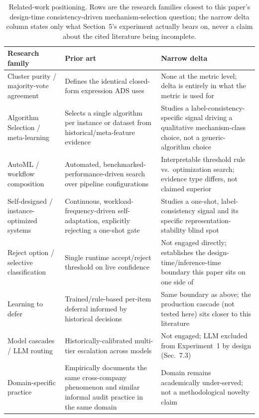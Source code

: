\documentclass[11pt]{article}
\begin{document}
\begin{table}[htbp]
\centering
\caption{Related-work positioning. Rows are the research families closest to
this paper's design-time consistency-driven mechanism-selection question;
the narrow delta column states only what Section~5's experiment actually
bears on, never a claim about the cited literature being incomplete.}
\label{tab:positioning}
\small
\begin{tabular}{p{2.6cm}p{4.1cm}p{4.4cm}}
\toprule
Research family & Prior art & Narrow delta \\
\midrule
Cluster purity / majority-vote agreement & Defines the identical closed-form expression ADS uses & None at the metric level; delta is entirely in what the metric is used for \\
Algorithm Selection / meta-learning & Selects a single algorithm per instance or dataset from historical/meta-feature evidence & Studies a label-consistency-specific signal driving a qualitative mechanism-class choice, not a generic-algorithm choice \\
AutoML / workflow composition & Automated, benchmarked-performance-driven search over pipeline configurations & Interpretable threshold rule vs.\ optimization search; evidence type differs, not claimed superior \\
Self-designed / instance-optimized systems & Continuous, workload-frequency-driven self-adaptation, explicitly rejecting a one-shot gate & Studies a one-shot, label-consistency signal and its specific representation-stability blind spot \\
Reject option / selective classification & Single runtime accept/reject threshold on live confidence & Not engaged directly; establishes the design-time/inference-time boundary this paper sits on one side of \\
Learning to defer & Trained/rule-based per-item deferral informed by historical decisions & Same boundary as above; the production cascade (not tested here) sits closer to this literature \\
Model cascades / LLM routing & Historically-calibrated multi-tier escalation across models & Not engaged; LLM excluded from Experiment~1 by design (Sec.~7.3) \\
Domain-specific practice & Empirically documents the same cross-company phenomenon and similar informal audit practice in the same domain & Domain remains academically under-served; not a methodological novelty claim \\
\bottomrule
\end{tabular}
\end{table}
\end{document}

